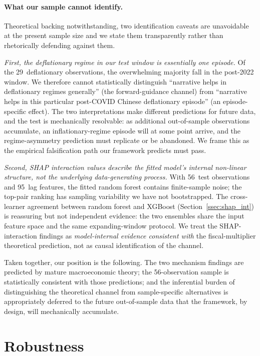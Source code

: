 \documentclass[AER]{AEA}
\begin{document}
\paragraph{What our sample cannot identify.}
Theoretical backing notwithstanding, two identification caveats are
unavoidable at the present sample size and we state them transparently
rather than rhetorically defending against them.

\emph{First, the deflationary regime in our test window is essentially
one episode.} Of the 29~deflationary observations, the overwhelming
majority fall in the post-2022 window. We therefore cannot statistically
distinguish ``narrative helps in deflationary regimes generally'' (the
forward-guidance channel) from ``narrative helps in this particular
post-COVID Chinese deflationary episode'' (an episode-specific effect).
The two interpretations make different predictions for future data, and
the test is mechanically resolvable: as additional out-of-sample
observations accumulate, an inflationary-regime episode will at some
point arrive, and the regime-asymmetry prediction must replicate or be
abandoned. We frame this as the empirical falsification path our
framework predicts must pass.

\emph{Second, SHAP interaction values describe the fitted model's internal
non-linear structure, not the underlying data-generating process.}
With 56~test observations and 95~lag features, the fitted random forest
contains finite-sample noise; the top-pair ranking has sampling
variability we have not bootstrapped. The cross-learner agreement
between random forest and XGBoost (Section~\ref{ssec:shap_int}) is
reassuring but not independent evidence: the two ensembles share the
input feature space and the same expanding-window protocol. We treat
the SHAP-interaction findings as \emph{model-internal evidence consistent
with} the fiscal-multiplier theoretical prediction, not as causal
identification of the channel.

Taken together, our position is the following. The two mechanism
findings are predicted by mature macroeconomic theory; the 56-observation
sample is statistically consistent with those predictions; and the
inferential burden of distinguishing the theoretical channel from
sample-specific alternatives is appropriately deferred to the future
out-of-sample data that the framework, by design, will mechanically
accumulate.

\section{Robustness}\label{sec:robustness}
\end{document}
